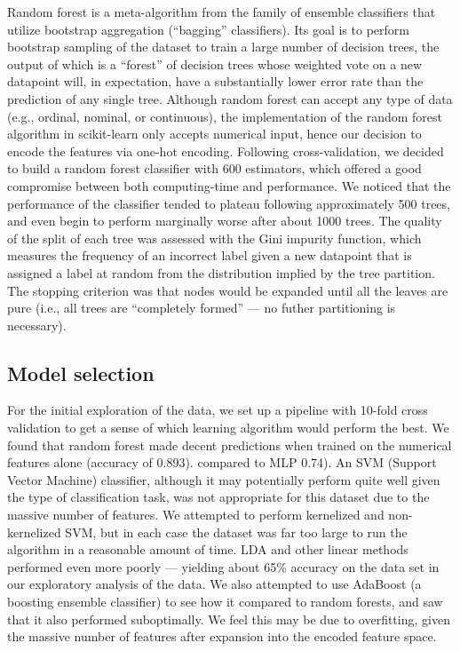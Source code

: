 \documentclass[11pt,a4paper]{article}
\begin{document}
Random forest is a meta-algorithm from the family of ensemble classifiers that utilize bootstrap aggregation (``bagging'' classifiers). Its goal is to perform bootstrap sampling of the dataset to train a large number of decision trees, the output of which is a ``forest'' of decision trees whose weighted vote on a new datapoint will, in expectation, have a substantially lower error rate than the prediction of any single tree\cite{Breiman:2001wf}. Although random forest can accept any type of data (e.g., ordinal, nominal, or continuous), the implementation of the random forest algorithm in scikit-learn only accepts numerical input, hence our decision to encode the features via one-hot encoding. Following cross-validation, we decided to build a random forest classifier with 600 estimators, which offered a good compromise between both computing-time and performance. We noticed that the performance of the classifier tended to plateau following approximately 500 trees, and even begin to perform marginally worse after about 1000 trees. The quality of the split of each tree was assessed with the Gini impurity function, which measures the frequency of an incorrect label given a new datapoint that is assigned a label at random from the distribution implied by the tree partition\cite{Grabmeier:2007da}. The stopping criterion was that nodes would be expanded until all the leaves are pure (i.e., all trees are ``completely formed'' --- no futher partitioning is necessary).\par

\subsection{Model selection}

For the initial exploration of the data, we set up a pipeline with 10-fold cross validation to get a sense of which learning algorithm would perform the best. We found that random forest made decent predictions when trained on the numerical features alone (accuracy of 0.893).  compared to MLP 0.74). An SVM (Support Vector Machine) classifier, although it may potentially perform quite well given the type of classification task, was not appropriate for this dataset due to the massive number of features. We attempted to perform kernelized and non-kernelized SVM, but in each case the dataset was far too large to run the algorithm in a reasonable amount of time. LDA and other linear methods performed even more poorly --- yielding about 65\% accuracy on the data set in our exploratory analysis of the data. We also attempted to use AdaBoost (a boosting ensemble classifier) to see how it compared to random forests, and saw that it also performed suboptimally. We feel this may be due to overfitting, given the massive number of features after expansion into the encoded feature space.
  
\end{document}
